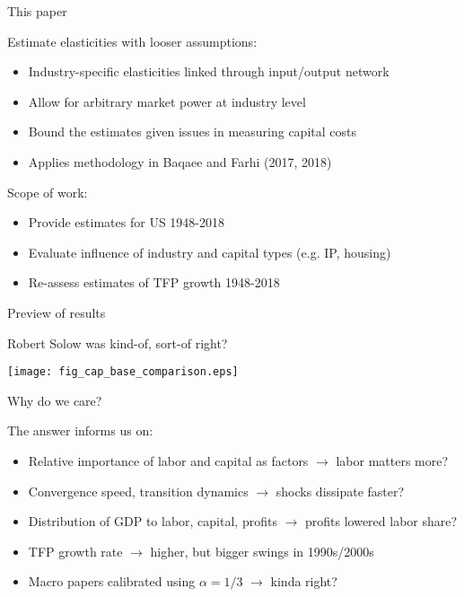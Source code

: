 \documentclass[10pt,xcolor=dvipsnames]{beamer}
\begin{document}
\begin{frame}{This paper}

Estimate elasticities with looser assumptions:
\begin{itemize}
  \item Industry-specific elasticities linked through input/output network
  \item Allow for arbitrary market power at industry level
  \item Bound the estimates given issues in measuring capital costs
  \item Applies methodology in Baqaee and Farhi (2017, 2018)
\end{itemize}

\pause
\vspace{.25in}
Scope of work:
\begin{itemize}
  \item Provide estimates for US 1948-2018
  \item Evaluate influence of industry and capital types (e.g. IP, housing)
  \item Re-assess estimates of TFP growth 1948-2018
\end{itemize}

\end{frame}


\begin{frame}{Preview of results}

Robert Solow was kind-of, sort-of right?

\begin{center}
\texttt{[image: fig\_cap\_base\_comparison.eps]}
\end{center}

\end{frame}

\begin{frame}{Why do we care?}

The answer informs us on:
\begin{itemize}
  \item Relative importance of labor and capital as factors $\rightarrow$ labor matters more?
  \item Convergence speed, transition dynamics $\rightarrow$ shocks dissipate faster?
  \item Distribution of GDP to labor, capital, profits $\rightarrow$ profits lowered labor share?
  \item TFP growth rate $\rightarrow$ higher, but bigger swings in 1990s/2000s
  \item Macro papers calibrated using $\alpha = 1/3$ $\rightarrow$ kinda right?
\end{itemize}

\end{frame}
\end{document}
